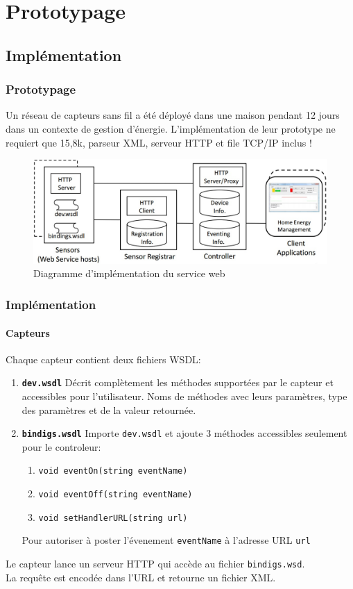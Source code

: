 \section{Prototypage}
\subsection{Implémentation}
\begin{frame}
 \frametitle{Prototypage}
 Un réseau de capteurs sans fil a été déployé dans une maison pendant 12 jours dans un contexte de gestion d'énergie.
 L'implémentation de leur prototype ne requiert que 15,8k, parseur XML, serveur HTTP et file TCP/IP inclus !
 \begin{figure}
  \centering
  \includegraphics[scale=0.36]{figures/implementation.jpg}
  \caption{Diagramme d'implémentation du service web}
 \end{figure} 
\end{frame}

\begin{frame}
 \frametitle{Implémentation}
 \framesubtitle{Capteurs}
 Chaque capteur contient deux fichiers WSDL:
 \begin{enumerate}
  \item \textbf{\texttt{dev.wsdl}} Décrit complètement les méthodes supportées par le capteur et accessibles pour l'utilisateur. Noms de méthodes avec leurs paramètres, type des paramètres et de la valeur retournée.
  \item \textbf{\texttt{bindigs.wsdl}} Importe \texttt{dev.wsdl} et ajoute 3 méthodes accessibles seulement pour le controleur:
   \begin{enumerate}
    \item \texttt{void eventOn(string eventName)}
    \item \texttt{void eventOff(string eventName)}
    \item \texttt{void setHandlerURL(string url)}
   \end{enumerate}
   Pour autoriser à poster l'évenement \texttt{eventName} à l'adresse URL \texttt{url}
 \end{enumerate}
 Le capteur lance un serveur HTTP qui accède au fichier \texttt{bindigs.wsd}.\\
 La requête est encodée dans l'URL et retourne un fichier XML.
\end{frame}

